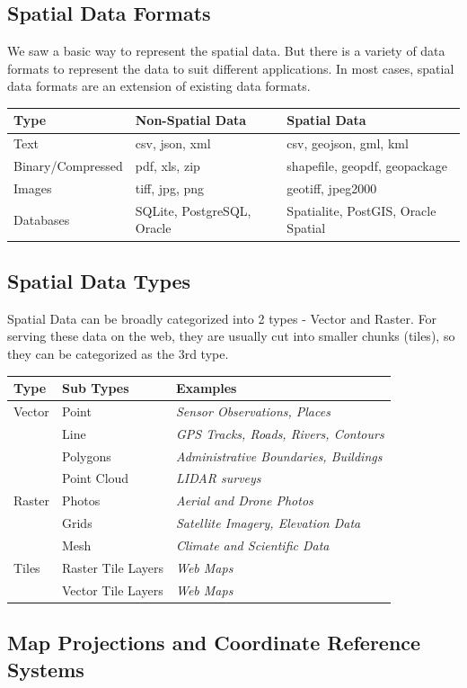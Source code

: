 \documentclass[
  12pt,
  a4paper]{article}
\begin{document}
\hypertarget{spatial-data-formats}{%
\subsection{Spatial Data Formats}\label{spatial-data-formats}}

We saw a basic way to represent the spatial data. But there is a variety
of data formats to represent the data to suit different applications. In
most cases, spatial data formats are an extension of existing data
formats.

\begin{longtable}[]{@{}lll@{}}
\toprule
\textbf{Type} & \textbf{Non-Spatial Data} & \textbf{Spatial
Data}\tabularnewline
\midrule
\endhead
Text & csv, json, xml & csv, geojson, gml, kml\tabularnewline
Binary/Compressed & pdf, xls, zip & shapefile, geopdf,
geopackage\tabularnewline
Images & tiff, jpg, png & geotiff, jpeg2000\tabularnewline
Databases & SQLite, PostgreSQL, Oracle & Spatialite, PostGIS, Oracle
Spatial\tabularnewline
\bottomrule
\end{longtable}

\hypertarget{spatial-data-types}{%
\subsection{Spatial Data Types}\label{spatial-data-types}}

Spatial Data can be broadly categorized into 2 types - Vector and
Raster. For serving these data on the web, they are usually cut into
smaller chunks (tiles), so they can be categorized as the 3rd type.

\begin{longtable}[]{@{}lll@{}}
\toprule
\textbf{Type} & \textbf{Sub Types} & \textbf{Examples}\tabularnewline
\midrule
\endhead
Vector & Point & \emph{Sensor Observations, Places}\tabularnewline
& Line & \emph{GPS Tracks, Roads, Rivers, Contours}\tabularnewline
& Polygons & \emph{Administrative Boundaries, Buildings}\tabularnewline
& Point Cloud & \emph{LIDAR surveys}\tabularnewline
Raster & Photos & \emph{Aerial and Drone Photos}\tabularnewline
& Grids & \emph{Satellite Imagery, Elevation Data}\tabularnewline
& Mesh & \emph{Climate and Scientific Data}\tabularnewline
Tiles & Raster Tile Layers & \emph{Web Maps}\tabularnewline
& Vector Tile Layers & \emph{Web Maps}\tabularnewline
\bottomrule
\end{longtable}

\hypertarget{map-projections-and-coordinate-reference-systems}{%
\subsection{Map Projections and Coordinate Reference
Systems}\label{map-projections-and-coordinate-reference-systems}}
\end{document}
